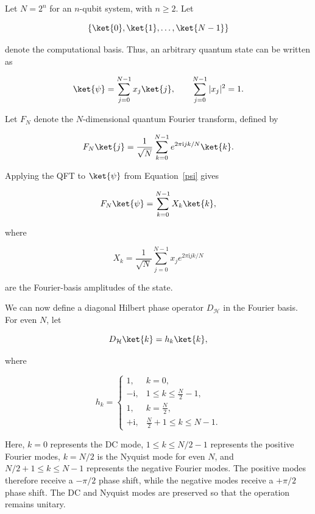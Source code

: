 \documentclass[11pt]{article}
\theoremstyle{plain}
\theoremstyle{definition}
\theoremstyle{remark}
\begin{document}
Let $N=2^n$ for an $n$-qubit system, with $n\geq2$. Let

\begin{equation}
\left\{
\ket{0},
\ket{1},
\ldots,
\ket{N-1}
\right\}
\end{equation}

denote the computational basis. Thus, an arbitrary quantum state can be written as

\begin{equation}
\ket{\psi}
=
\sum_{j=0}^{N-1}
x_j\ket{j},
\qquad
\sum_{j=0}^{N-1}|x_j|^2=1.
\label{psi}
\end{equation}

Let $F_N$ denote the $N$-dimensional quantum Fourier transform, defined by

\begin{equation}
F_N\ket{j}
=
\frac{1}{\sqrt{N}}
\sum_{k=0}^{N-1}
e^{2\pi \mathrm{i}jk/N}\ket{k}.
\end{equation}

Applying the QFT to $\ket{\psi}$ from Equation~\eqref{psi} gives

\begin{equation}
F_N\ket{\psi}
=
\sum_{k=0}^{N-1}
X_k\ket{k},
\end{equation}

where

\begin{equation}
X_k
=
\frac{1}{\sqrt{N}}
\sum_{j=0}^{N-1}
x_j e^{2\pi \mathrm{i}jk/N}
\end{equation}

are the Fourier-basis amplitudes of the state.

We can now define a diagonal Hilbert phase operator $D_{\mathcal H}$ in the Fourier basis. For even $N$, let

\begin{equation}
D_{\mathcal H}\ket{k}
=
h_k\ket{k},
\end{equation}

where

\begin{equation}
h_k =
\begin{cases}
1, & k=0,\\
-\mathrm{i}, & 1\leq k\leq \frac{N}{2}-1,\\
1, & k=\frac{N}{2},\\
+\mathrm{i}, & \frac{N}{2}+1\leq k\leq N-1.
\end{cases}
\end{equation}

Here, $k=0$ represents the DC mode,
$1\leq k\leq N/2-1$ represents the positive Fourier modes,
$k=N/2$ is the Nyquist mode for even $N$, and
$N/2+1\leq k\leq N-1$ represents the negative Fourier modes.
The positive modes therefore receive a $-\pi/2$ phase shift, while the negative modes receive a $+\pi/2$ phase shift. The DC and Nyquist modes are preserved so that the operation remains unitary.
\end{document}
